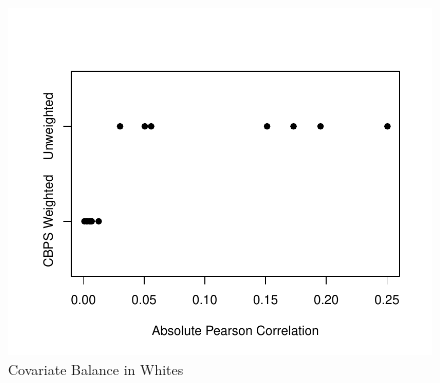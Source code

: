 \documentclass[]{AEA}
\begin{document}
\begin{figure} 
\caption{Covariate Balance in Whites}
\label{balPlotWhite}

\begin{center}\includegraphics{Final-Draft_files/figure-latex/unnamed-chunk-13-1} \end{center}



\FloatBarrier

\end{figure}
\end{document}
